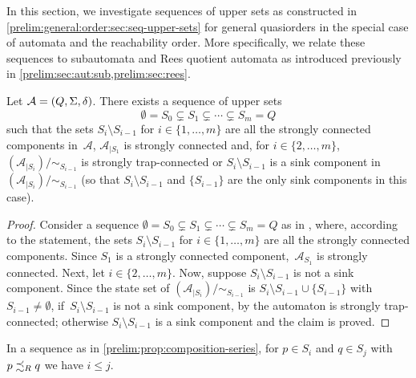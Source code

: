 
In this section, we investigate sequences of upper sets
as constructed in \cref{prelim:general:order:sec:seq-upper-sets} for general quasiorders
in the special case of automata and the reachability order. More specifically, we relate these sequences
to subautomata and Rees quotient automata as introduced previously in \cref{prelim:sec:aut:sub,prelim:sec:rees}.

\begin{proposition} \label{prelim:prop:composition-series}
	Let $\mathcal A = (Q, \Sigma, \delta)$.
	There exists a sequence of upper sets 
	\[
	\emptyset = S_0 \subsetneq S_1 \subsetneq \cdots \subsetneq S_m = Q
	\]
	such that the sets $S_i \setminus S_{i-1}$
	for $i \in \{1,\ldots,m\}$
	are all the strongly connected components in~$\mathcal A$,
	$\mathcal A_{|S_1}$ is strongly connected
	and, for $i \in \{2,\ldots,m\}$,
	$( \mathcal A_{|S_i} ) / {\sim_{S_{i-1}}}$
	is strongly trap-connected
	or $S_i \setminus S_{i-1}$ is a sink component in $( \mathcal A_{|S_i} ) / {\sim_{S_{i-1}}}$ (so that $S_i \setminus S_{i-1}$ 
	and $\{S_{i-1}\}$
	are the only sink components in this case).
\end{proposition}
\begin{proof}
	Consider a sequence $\emptyset = S_0 \subsetneq S_1 \subsetneq \cdots \subsetneq S_m = Q$
	as in ,
	where, according to the statement,
	the sets $S_i \setminus S_{i-1}$ for $i \in \{1,\ldots,m\}$
	are all the strongly connected components. Since $S_1$
	is a strongly connected component,~$\mathcal A_{S_1}$
	is strongly connected.
	Next, let $i \in \{2,\ldots,m\}$.
	Now, suppose $S_i \setminus S_{i-1}$ 
	is not a sink component.
	Since the state set of  $( \mathcal A_{|S_i} ) / {\sim_{S_{i-1}}}$
	is $S_i \setminus S_{i-1} \cup \{S_{i-1}\}$ with $S_{i-1} \ne \emptyset$,
	if~$S_i \setminus S_{i-1}$ is not a sink component,
	by 
	the automaton is strongly trap-connected;
	otherwise $S_i \setminus S_{i-1}$ is a sink component
	and the claim is proved.	
\end{proof}

In a sequence as in \cref{prelim:prop:composition-series},
for $p \in S_i$ and $q \in S_j$ with $p \precsim_R q$ we have $i \le j$.

